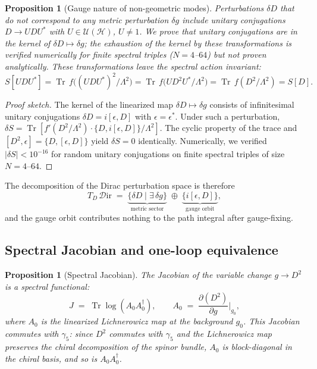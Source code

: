 \documentclass[12pt,a4paper]{article}
\newtheorem{proposition}[theorem]{Proposition}
\theoremstyle{definition}
\theoremstyle{remark}
\newcommand{\Tr}{\operatorname{Tr}}
\newcommand{\Lam}{\Lambda}
\newcommand{\Hilb}{\mathcal{H}}
\begin{document}
\begin{proposition}[Gauge nature of non-geometric modes]
\label{prop:gauge}
Perturbations $\delta D$ that do not correspond to any metric perturbation
$\delta g$ include unitary conjugations $D \to U D U^*$ with
$U \in \mathcal{U}(\Hilb)$, $U \neq 1$.  We prove that unitary conjugations
are in the kernel of $\delta D \mapsto \delta g$; the exhaustion of the kernel
by these transformations is verified numerically for finite spectral triples
($N = 4$--$64$) but not proven analytically.  These transformations leave the
spectral action invariant:
\begin{equation}
  S[UDU^*] = \Tr\,f\bigl((UDU^*)^2/\Lam^2\bigr)
  = \Tr\,f\bigl(U D^2 U^*/\Lam^2\bigr)
  = \Tr\,f(D^2/\Lam^2) = S[D].
\end{equation}
\end{proposition}

\begin{proof}[Proof sketch]
The kernel of the linearized map $\delta D \mapsto \delta g$ consists of
infinitesimal unitary conjugations $\delta D = i[\epsilon, D]$ with
$\epsilon = \epsilon^*$.  Under such a perturbation,
$\delta S = \Tr[f'(D^2/\Lam^2) \cdot \{D, i[\epsilon, D]\}/\Lam^2]$.
The cyclic property of the trace and $[D^2, \epsilon] = \{D, [\epsilon, D]\}$
yield $\delta S = 0$ identically.  Numerically, we verified
$|\delta S| < 10^{-16}$ for random unitary conjugations on finite spectral
triples of size $N = 4$--$64$.
\end{proof}

\noindent
The decomposition of the Dirac perturbation space is therefore
\begin{equation}
  T_D\,\mathcal{D}\mathrm{ir} \;=\;
  \underbrace{\{\delta D \mid \exists\, \delta g\}}_{\text{metric sector}}
  \;\oplus\;
  \underbrace{\{i[\epsilon, D]\}}_{\text{gauge orbit}},
\end{equation}
and the gauge orbit contributes nothing to the path integral after
gauge-fixing.

\subsection{Spectral Jacobian and one-loop equivalence}

\begin{proposition}[Spectral Jacobian]
\label{prop:jacobian}
The Jacobian of the variable change $g \to D^2$ is a spectral functional:
\begin{equation}
  J \;=\; \Tr\log(A_0 A_0^\dagger),
  \qquad
  A_0 \;=\; \frac{\partial(D^2)}{\partial g}\bigg|_{g_0},
\end{equation}
where $A_0$ is the linearized Lichnerowicz map at the background $g_0$.
This Jacobian commutes with $\gamma_5$: since $D^2$ commutes with $\gamma_5$
and the Lichnerowicz map preserves the chiral decomposition of the spinor
bundle, $A_0$ is block-diagonal in the chiral basis, and so is $A_0 A_0^\dagger$.
\end{proposition}
\end{document}
